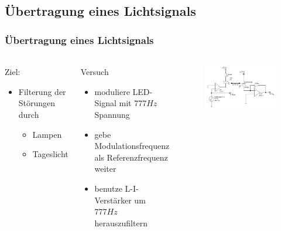 \subsection{Übertragung eines Lichtsignals} %
\label{sub:Übertragung eines Lichtsignals}
\begin{frame}
    \frametitle{Übertragung eines Lichtsignals}
    \framesubtitle{}
     \begin{columns}[c]
        \begin{block}{Ziel:}
             \begin{itemize}
                 \item Filterung der Störungen durch
                 \begin{itemize}
                     \item Lampen
                     \item Tageslicht
                 \end{itemize}
             \end{itemize}
        \end{block}
        \begin{block}{Versuch}
            \begin{itemize}
                \item moduliere LED-Signal mit $777Hz$ Spannung
                \item gebe Modulationsfrequenz als Referenzfrequenz weiter
                \item benutze L-I-Verstärker um $777Hz$ herauszufiltern
            \end{itemize}
        \end{block}
         \begin{figure}[H]
         \begin{center}
                 \includegraphics[scale=0.25]{./img/schaltung/optisch.png}
         \end{center}
         \end{figure}
     \end{columns}
\end{frame}

